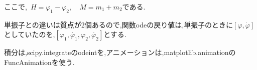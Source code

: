 ここで, $H=\varphi_1-\varphi_2 ,\quad M=m_1+m_2$である.

単振子との違いは質点が2個あるので,関数odeの戻り値は,単振子のときに$\left[\varphi, \dot{\varphi}\right]$としていたのを,$\left[\varphi_1, \dot{\varphi_1}, \varphi_2, \dot{\varphi_2}\right]$とする.

積分は,scipy.integrateのodeintを,アニメーションは,matplotlib.animationのFuncAnimationを使う.

\lstset{escapechar=@,style=custompy}

